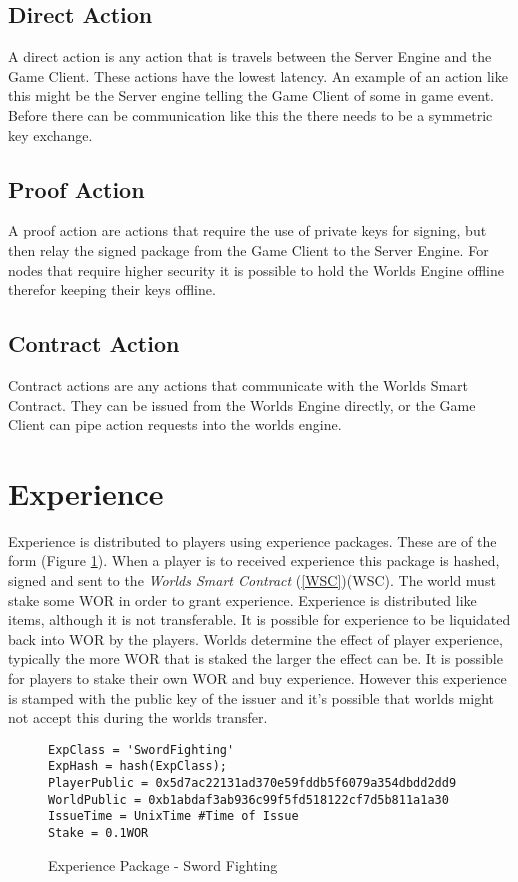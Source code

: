 \documentclass[runningheads,a4paper]{llncs}
\begin{document}
\subsection{Direct Action}
A direct action is any action that is travels between the Server Engine and the Game Client. These actions have the lowest latency. An example of an action like this might be the Server engine telling the Game Client of some in game event. Before there can be communication like this the there needs to be a symmetric key exchange. 

\subsection{Proof Action}
A proof action are actions that require the use of private keys for signing, but then relay the signed package from the Game Client to the Server Engine. For nodes that require higher security it is possible to hold the Worlds Engine offline therefor keeping their keys offline. 

\subsection{Contract Action}
Contract actions are any actions that communicate with the Worlds Smart Contract. They can be issued from the Worlds Engine directly, or the Game Client can pipe action requests into the worlds engine. 

\section{Experience}
\label{exp}
Experience is distributed to players using experience packages. These are of the form (Figure \ref{exppkg}). When a player is to received experience this package is hashed, signed and sent to the \textit{Worlds Smart Contract} (\ref{WSC})(WSC). The world must stake some WOR in order to grant experience. Experience is distributed like items, although it is not transferable. It is possible for experience to be liquidated back into WOR by the players. Worlds determine the effect of player experience, typically the more WOR that is staked the larger the effect can be. It is possible for players to stake their own WOR and buy experience. However this experience is stamped with the public key of the issuer and it's possible that worlds might not accept this during the worlds transfer. 


\begin{figure}[H]
\centering
\caption{Experience Package - Sword Fighting}
\label{exppkg}
\begin{lstlisting}
ExpClass = 'SwordFighting'
ExpHash = hash(ExpClass);
PlayerPublic = 0x5d7ac22131ad370e59fddb5f6079a354dbdd2dd9
WorldPublic = 0xb1abdaf3ab936c99f5fd518122cf7d5b811a1a30
IssueTime = UnixTime #Time of Issue
Stake = 0.1WOR
\end{lstlisting}
\end{figure}
\end{document}
